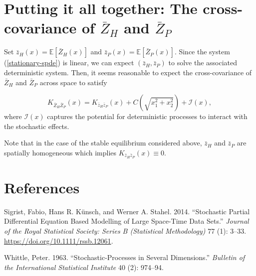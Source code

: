 \documentclass{article}
\begin{document}
\hypertarget{putting-it-all-together-the-cross-covariance-of-bar-z_h-and-bar-z_p}{%
\section{\texorpdfstring{Putting it all together: The cross-covariance
of \(\bar Z_H\) and
\(\bar Z_P\)}{Putting it all together: The cross-covariance of \textbackslash bar Z\_H and \textbackslash bar Z\_P}}\label{putting-it-all-together-the-cross-covariance-of-bar-z_h-and-bar-z_p}}

Set \(\bar z_H(x)=\mathbb E[\bar Z_H(x)]\) and
\(\bar z_P(x)=\mathbb E[\bar Z_P(x)]\). Since the system
(\ref{stationary-spde}) is linear, we can expect \((\bar z_H,\bar z_P)\)
to solve the associated deterministic system. Then, it seems reasonable
to expect the cross-covariance of \(\bar Z_H\) and \(\bar Z_P\) across
space to satisfy

\begin{equation}
  K_{\bar Z_H\bar Z_P}(x)=K_{\bar z_H\bar z_P}(x)+C\left(\sqrt{x_1^2+x_2^2}\right)+\mathcal I(x),
\end{equation} where \(\mathcal I(x)\) captures the potential for
deterministic processes to interact with the stochastic effects.

Note that in the case of the stable equilibrium considered above,
\(\bar z_H\) and \(\bar z_P\) are spatially homogeneous which implies
\(K_{\bar z_H\bar z_P}(x)\equiv0\).

\newpage

\hypertarget{references}{%
\section*{References}\label{references}}

\hypertarget{refs}{}
\leavevmode\hypertarget{ref-Sigrist2014}{}%
Sigrist, Fabio, Hans R. Künsch, and Werner A. Stahel. 2014. ``Stochastic
Partial Differential Equation Based Modelling of Large Space-Time Data
Sets.'' \emph{Journal of the Royal Statistical Society: Series B
(Statistical Methodology)} 77 (1): 3--33.
\url{https://doi.org/10.1111/rssb.12061}.

\leavevmode\hypertarget{ref-whittle1963stochastic}{}%
Whittle, Peter. 1963. ``Stochastic-Processes in Several Dimensions.''
\emph{Bulletin of the International Statistical Institute} 40 (2):
974--94.



\end{document}
